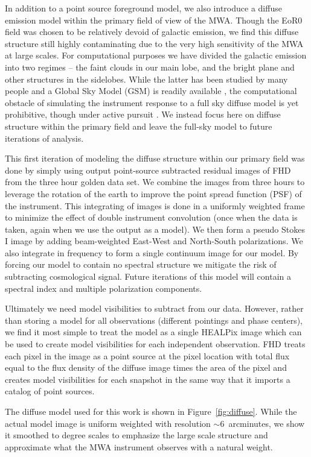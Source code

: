 \documentclass[iop]{emulateapj}
\begin{document}
In addition to a point source foreground model, we also introduce a diffuse emission model 
within the primary field of view of the MWA. Though the EoR0 field was chosen to be 
relatively devoid of galactic emission, we find this diffuse structure still highly contaminating 
due to the very high sensitivity of the MWA at large scales. For computational purposes we 
have divided the galactic emission into two regimes -- the faint clouds in our main lobe, and 
the bright plane and other structures in the sidelobes. While the latter has been studied by 
many people and a Global Sky Model (GSM) is readily available 
\citep{deOliveira-Costa:2008}, the computational obstacle of simulating the instrument 
response to a full sky diffuse model is yet prohibitive, though under active pursuit 
\citep{Thyagarajan:2015}. We instead focus here on diffuse structure within the primary field 
and leave the full-sky model to future iterations of analysis.

This first iteration of modeling the diffuse structure within our primary field was done by 
simply using output point-source subtracted residual images of FHD from the three hour 
golden data set. We combine the images from three hours to leverage the rotation of the 
earth to improve the point spread function (PSF) of the instrument. This integrating of 
images is done in a uniformly weighted frame to minimize the effect of double instrument 
convolution (once when the data is taken, again when we use the output as a model). We 
then form a pseudo Stokes I image by adding beam-weighted East-West and North-South 
polarizations. We also integrate in frequency to form a single continuum image for our 
model. By forcing our model to contain no spectral structure we mitigate the risk of 
subtracting cosmological signal. Future iterations of this model will contain a spectral index 
and multiple polarization components.

Ultimately we need model visibilities to subtract from our data. However, rather than storing 
a model for all observations (different pointings and phase centers), we find it most simple 
to treat the model as a single HEALPix image which can be used to create model visibilities 
for each independent observation. FHD treats each pixel in the image as a point source at 
the pixel location with total flux equal to the flux density of the diffuse image times the area 
of the pixel and creates model visibilities for each snapshot in the same way that it imports 
a catalog of point sources.

The diffuse model used for this work is shown in Figure~\ref{fig:diffuse}. While the actual 
model image is uniform weighted with resolution $\sim\!6$~arcminutes, we show it 
smoothed to degree scales to emphasize the large scale structure and approximate what 
the MWA instrument observes with a natural weight.
\end{document}
